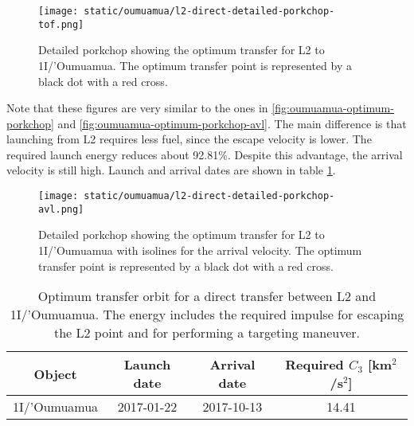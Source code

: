 \begin{figure}[H]
  \centering
  \texttt{[image: static/oumuamua/l2-direct-detailed-porkchop-tof.png]}
  \caption[Detailed porkchop showing the optimum transfer for
    L2 to 1I/'Oumuamua with the time of flight.]{Detailed porkchop showing the optimum transfer for
    L2 to 1I/'Oumuamua. The optimum transfer point is represented by a black dot
        with a red cross.
  }
  \label{fig:l2-oumuamua-optimum-porkchop}
\end{figure}

Note that these figures are very similar to the ones in
\ref{fig:oumuamua-optimum-porkchop} and \ref{fig:oumuamua-optimum-porkchop-avl}.
The main difference is that launching from L2 requires less fuel, since the
escape velocity is lower. The required launch energy reduces about 92.81\%.
Despite this advantage, the arrival velocity is still high. Launch and arrival
dates are shown in table \ref{tab:l2-oumuamua-direct-transfer-optimum}.

\begin{figure}[H]
  \centering
  \texttt{[image: static/oumuamua/l2-direct-detailed-porkchop-avl.png]}
  \caption[Detailed porkchop showing the optimum transfer for
    L2 to 1I/'Oumuamua with the arrival velocity.]{Detailed porkchop showing the
    optimum transfer for L2 to 1I/'Oumuamua with isolines for the arrival
    velocity. The optimum transfer point is represented by a black dot
        with a red cross.
}
  \label{fig:l2-oumuamua-optimum-porkchop-avl}
\end{figure}

\vspace{1cm}
\begin{table}[H]
  \centering
  \begin{tabular}{|c|c|c|c|}
    \hline
    Object       & Launch date & Arrival date & Required $C_3$ [km$^2$/s$^2$] \\
    \hline
    1I/'Oumuamua & 2017-01-22  & 2017-10-13   & 14.41                         \\
    \hline
  \end{tabular}
  \caption[Optimum transfer orbit for a direct transfer between L2 and
    1I/'Oumuamua.]{Optimum transfer orbit for a direct transfer between
    L2 and 1I/'Oumuamua. The energy includes the required impulse for
    escaping the L2 point and for performing a targeting maneuver.}
  \label{tab:l2-oumuamua-direct-transfer-optimum}
\end{table}

